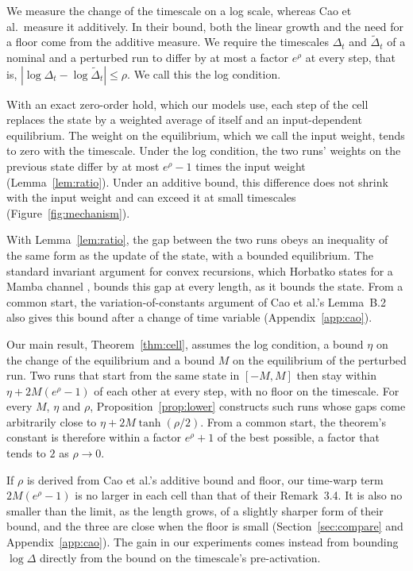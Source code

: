 \documentclass[11pt, a4paper]{article}
\theoremstyle{remark}
\theoremstyle{plain}
\begin{document}
We measure the change of the timescale on a log scale, whereas Cao et al.\ measure it additively.
In their bound, both the linear growth and the need for a floor come from the additive measure. We
require the timescales $\Delta_t$ and $\tilde\Delta_t$ of a nominal and a perturbed run to differ
by at most a factor $e^{\rho}$ at every step, that is,
$|\log\Delta_t - \log\tilde\Delta_t| \le \rho$. We call this the log condition.

With an exact zero-order hold, which our models use, each step of the cell replaces the state by a
weighted average of itself and an input-dependent equilibrium. The weight on the equilibrium,
which we call the input weight, tends to zero with the timescale. Under the log condition, the two
runs' weights on the previous state differ by at most $e^{\rho} - 1$ times the input weight
(Lemma~\ref{lem:ratio}). Under an additive bound, this difference does not shrink with the input
weight and can exceed it at small timescales (Figure~\ref{fig:mechanism}).

With Lemma~\ref{lem:ratio}, the gap between the two runs obeys an inequality of the same form as
the update of the state, with a bounded equilibrium. The standard invariant argument for convex
recursions, which Horbatko states for a Mamba channel \citep[Lemma~4.4]{horbatko2026sessa}, bounds
this gap at every length, as it bounds the state. From a common start, the variation-of-constants
argument of Cao et al.'s Lemma~B.2 also gives this bound after a change of time
variable (Appendix~\ref{app:cao}).

Our main result, Theorem~\ref{thm:cell}, assumes the log condition, a bound $\eta$ on the change
of the equilibrium and a bound $M$ on the equilibrium of the perturbed run. Two runs that start
from the same state in $[-M, M]$ then stay within $\eta + 2M(e^{\rho} - 1)$ of each other at every
step, with no floor on the timescale. For every $M$, $\eta$ and $\rho$,
Proposition~\ref{prop:lower} constructs such runs whose gaps come arbitrarily close to
$\eta + 2M\tanh(\rho/2)$. From a common start, the theorem's constant is therefore within a factor
$e^{\rho} + 1$ of the best possible, a factor that tends to $2$ as $\rho \to 0$.

If $\rho$ is derived from Cao et al.'s additive bound and floor, our time-warp term
$2M(e^{\rho} - 1)$ is no larger in each cell than that of their Remark~3.4. It is also no smaller
than the limit, as the length grows, of a slightly sharper form of their bound, and the three are
close when the floor is small (Section~\ref{sec:compare} and Appendix~\ref{app:cao}). The gain in our experiments comes instead from bounding
$\log\Delta$ directly from the bound on the timescale's pre-activation.
\end{document}

